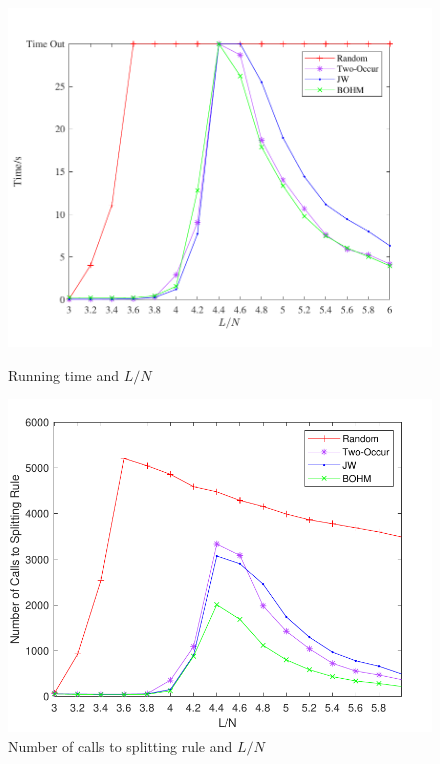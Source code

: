 \documentclass[12pt]{article}
\begin{document}
\begin{figure}[t]
	\setlength{\leftskip}{0pt}
	\begin{minipage}[t]{0.5\textwidth}
		\centering
		\includegraphics[width=1.1\columnwidth,height=0.72\columnwidth]{TimevsLN}
		\caption{Running time and $L/N$}
		\label{fig:ex-qa}
	\end{minipage}
	\begin{minipage}[t]{0.5\textwidth}
		\centering
		\includegraphics[width=1\columnwidth,height=0.68\columnwidth]{CallsvsLN}
		\caption{Number of calls to splitting rule and $L/N$}
		\label{fig:ex-sm}
	\end{minipage}
\end{figure}
\end{document}
